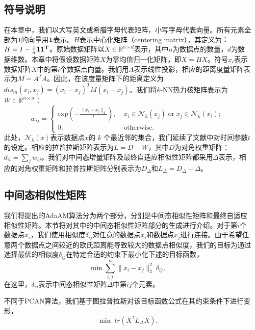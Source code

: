\subsection{符号说明}
在本章中，我们以大写英文或希腊字母代表矩阵，小写字母代表向量。所有元素全部为$1$的向量用$\bf{1}$表示。$H$表示中心化矩阵（centering matrix），其定义为：$H = I-\frac{1}{n}\bf{1}\bf{1}^T$。原始数据矩阵以$X \in \mathbb{R}^{n\times d}$表示，其中$n$为数据点的数量，$d$为数据维数。本章中将假设数据矩阵$X$为零均值归一化矩阵，即$X = HX$。符号$x_i$表示数据矩阵$X$中的第$i$个数据点向量。我们用$A$表示线性投影，相应的距离度量矩阵表示为$M = A^TA$。因此，在该度量矩阵下的距离定义为$dis_m(x_i, x_j) = (x_i - x_j)^TM(x_i - x_j)$。我们将$k$-NN热力核矩阵表示为$W \in \mathbb{R}^{n \times n}$：
\begin{equation}
	w_{ij} = \begin{cases} \mathrm{exp}(-\frac{\|x_i-x_j\|_{2}}{t}), \; &x_i\in\mathcal{N}_k(x_j)\;\mathrm{or}\; x_j\in\mathcal{N}_k(x_i);\\
		0, &\mathrm{otherwise.}\end{cases}          
\end{equation}
此处，$\mathcal{N}_k(x)$表示数据点$x$的 $k$ 个最近邻的集合，我们延续了文献\parencite{niyogi2004locality}中对时间参数$t$的设定。相应的拉普拉斯矩阵表示为$L=D-W$，其中$D$为对角权重矩阵：$d_{ii} = \sum_j w_{ij}$。我们对中间态增量矩阵及最终自适应相似性矩阵都采用$\Delta$表示，相应的对角权重矩阵和拉普拉斯矩阵分别表示为$D_\Delta$和$L_\Delta = D_\Delta-\Delta$。

\subsection{中间态相似性矩阵}
我们将提出的AdaAM算法分为两个部分，分别是中间态相似性矩阵和最终自适应相似性矩阵。本节将对其中的中间态相似性矩阵部分的生成进行介绍。对于第$i$个数据点$x_i$，我们使用相似度$\delta_{ij}$对任意的数据点$x_i$和数据点$x_j$进行连接。由于希望任意两个数据点之间较近的欧氏距离能导致较大的数据点相似度，我们的目标为通过选择最优的相似度$\delta_{ij}$在特定合适的约束下最小化下述的目标函数，
\begin{equation}
	\mathop{\mathrm{min}} \sum_{i,j}^{n} \|x_i-x_j\|_2^2\;\delta_{ij},
\end{equation}
在这里，$\delta_{ij}$表示中间态相似性矩阵$\Delta$中第$ij$个元素。

不同于PCAN算法\cite{nie2014clustering}，我们基于图拉普拉斯对该目标函数公式在其约束条件下进行变形，
\begin{equation}
	\mathop{\mathrm{min}}\; tr(X^TL_\Delta X).
	\label{eq2:Delta}
\end{equation}

